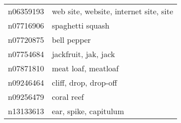 \begin{appendices}
\begin{longtabu}{X|X[4]}
    		n06359193 &                                                                                     web site, website, internet site, site \tabularnewline
    		n07716906 &                                                                                                           spaghetti squash \tabularnewline
    		n07720875 &                                                                                                                bell pepper \tabularnewline
    		n07754684 &                                                                                                       jackfruit, jak, jack \tabularnewline
    		n07871810 &                                                                                                        meat loaf, meatloaf \tabularnewline
    		n09246464 &                                                                                                      cliff, drop, drop-off \tabularnewline
    		n09256479 &                                                                                                                 coral reef \tabularnewline
    		n13133613 &                                                                                                      ear, spike, capitulum \tabularnewline
    		\bottomrule
    	\end{longtabu}
    	
    \end{appendices}

    \endgroup
    
    
    